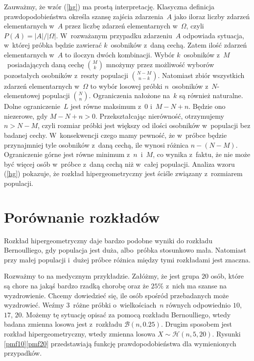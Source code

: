 Zauważmy, że wzór (\ref{hg}) ma prostą interpretację. Klasyczna definicja prawdopodobieństwa określa szansę zajścia zdarzenia~$A$ jako iloraz liczby zdarzeń elementarnych w~$A$ przez liczbę zdarzeń elementarnych w~$\Omega$, czyli $P(A) = |A|/|\Omega|$. W~rozważanym przypadku zdarzeniu~$A$ odpowiada sytuacja, w~której próbka będzie zawierać $k$~osobników z~daną cechą. Zatem ilość zdarzeń elementarnych w~$A$ to iloczyn dwóch kombinacji. Wybór $k$~osobników z~$M$~posiadających daną cechę $\binom{M}{k}$ mnożymy przez możliwość wyborów pozostałych osobników z~reszty populacji $\binom{N-M}{n-k}$. Natomiast zbiór wszystkich zdarzeń elementarnych w~$\Omega$ to wybór losowej próbki $n$~osobników z~$N$-elementowej populacji $\binom{N}{n}$. Ograniczenia nałożone na~$k$ są również naturalne. Dolne ograniczenie~$L$ jest równe maksimum z~$0$ i~$M-N+n$. Będzie ono niezerowe, gdy $M-N+n>0$. Przekształcając nierówność, otrzymujemy $n>N-M$, czyli rozmiar próbki jest większy od ilości osobników w~populacji bez badanej cechy. W~konsekwencji czego mamy pewność, że w~próbce będzie przynajmniej tyle osobników z~daną cechą, ile wynosi różnica $n-(N-M)$. Ograniczenie górne jest równe minimum z~$n$~i~$M$, co wynika z~faktu, że nie może być więcej osób w~próbce z~daną cechą niż w~całej populacji. Analiza wzoru (\ref{hg}) pokazuje, że rozkład hipergeometryczny jest ściśle związany z~rozmiarem populacji.

\section{Porównanie rozkładów}

Rozkład hipergeometryczny daje bardzo podobne wyniki do rozkładu Bernoulliego, gdy populacja jest duża, albo~próbka stosunkowo mała. Natomiast przy małej populacji i~dużej próbce różnica między tymi rozkładami jest znaczna.

Rozważmy to na medycznym przykładzie. Załóżmy, że jest grupa $20$ osób, które są chore na jakąś bardzo rzadką chorobę oraz że $25\%$ z~nich ma szanse na wyzdrowienie. Chcemy dowiedzieć się, ile osób spośród przebadanych może wyzdrowieć. Weźmy $3$~różne próbki o~wielkościach~$n$ równych odpowiednio $10$, $17$, $20$. Możemy tę sytuację opisać za pomocą rozkładu Bernoulliego, wtedy badana zmienna losowa jest z~rozkładu $\mathcal{B}(n,0.25)$. Drugim sposobem jest rozkład hipergeometryczny, wtedy zmienna losowa $X\sim\mathcal{H}(n,5,20)$. Rysunki \ref{pmf10}\ppauza\ref{pmf20} przedstawiają funkcję prawdopodobieństwa dla wymienionych przypadków.

